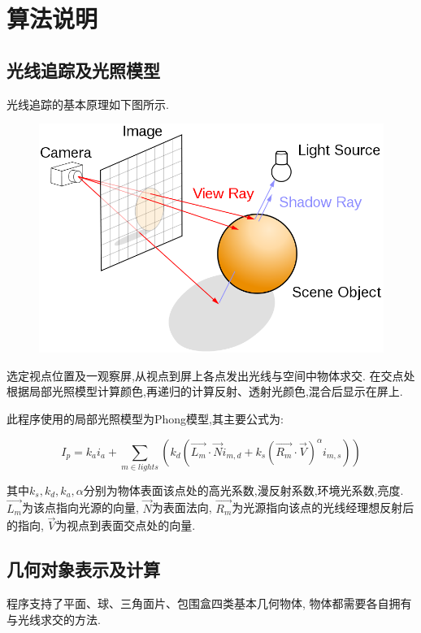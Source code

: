\section{算法说明}
\subsection{光线追踪及光照模型}
光线追踪的基本原理如下图所示.
\begin{figure}[H]
  \centering
  \includegraphics[scale=0.4]{res/ray_tracing.png}
\end{figure}

选定视点位置及一观察屏,从视点到屏上各点发出光线与空间中物体求交.
在交点处根据局部光照模型计算颜色,再递归的计算反射、透射光颜色,混合后显示在屏上.

此程序使用的局部光照模型为Phong模型,其主要公式为\cite{phong}:

\[  I_p = k_ai_a + \sum_{m\in lights} (k_d ( \overrightarrow{L_m} \cdot \overrightarrow{N} i_{m, d} + k_s(\overrightarrow{R_m}\cdot
  \overrightarrow{V})^{\alpha} i_{m, s}))  \]

其中$ k_s, k_d, k_a, \alpha$分别为物体表面该点处的高光系数,漫反射系数,环境光系数,亮度.
$ \overrightarrow{L_m}$为该点指向光源的向量, $ \overrightarrow{N}$为表面法向,
$ \overrightarrow{R_m}$为光源指向该点的光线经理想反射后的指向,
$ \overrightarrow{V}$为视点到表面交点处的向量.

\subsection{几何对象表示及计算}
程序支持了平面、球、三角面片、包围盒四类基本几何物体,
物体都需要各自拥有与光线求交的方法.

